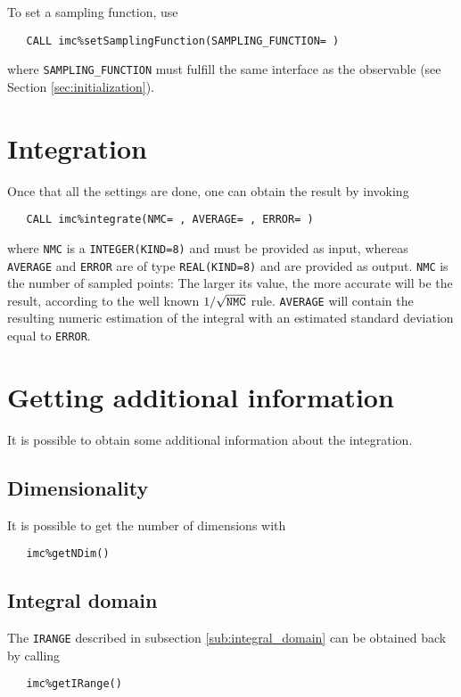 \documentclass[11pt,a4paper,twoside]{article}
\begin{document}
To set a sampling function, use
\begin{verbatim}
   CALL imc%setSamplingFunction(SAMPLING_FUNCTION= )
\end{verbatim}
where \verb+SAMPLING_FUNCTION+ must fulfill the same interface as the observable (see Section \ref{sec:initialization}).



\section{Integration} %
\label{sec:integration}
Once that all the settings are done, one can obtain the result by invoking
\begin{verbatim}
   CALL imc%integrate(NMC= , AVERAGE= , ERROR= )
\end{verbatim}
where \verb+NMC+ is a \verb+INTEGER(KIND=8)+ and must be provided as input, whereas \verb+AVERAGE+ and \verb+ERROR+ are of type \verb+REAL(KIND=8)+ and are provided as output.
\verb+NMC+ is the number of sampled points: The larger its value, the more accurate will be the result, according to the well known $1/\sqrt{\verb+NMC+}$ rule.
\verb+AVERAGE+ will contain the resulting numeric estimation of the integral with an estimated standard deviation equal to \verb+ERROR+.




\section{Getting additional information} %
\label{sec:getting_additional_information}
It is possible to obtain some additional information about the integration.

\subsection{Dimensionality} %
\label{sub:dimensionality}
It is possible to get the number of dimensions with
\begin{verbatim}
   imc%getNDim()
\end{verbatim}

\subsection{Integral domain} %
\label{sub:integral_domain2}
The \verb+IRANGE+ described in subsection \ref{sub:integral_domain} can be obtained back by calling
\begin{verbatim}
   imc%getIRange()
\end{verbatim}
\end{document}
